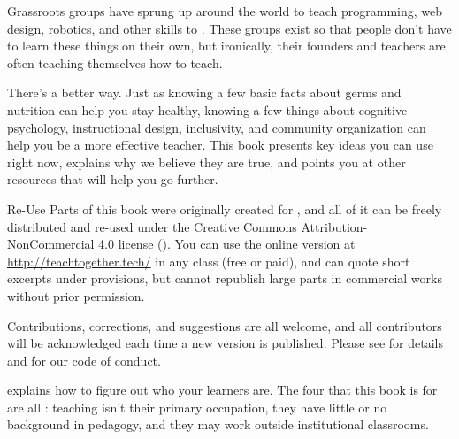 
Grassroots groups have sprung up around the world
to teach programming, web design, robotics, and other skills
to .
These groups exist so that people don't have to learn these things on their own,
but ironically,
their founders and teachers are often teaching themselves how to teach.

There's a better way.
Just as knowing a few basic facts about germs and nutrition can help you stay healthy,
knowing a few things about cognitive psychology,
instructional design,
inclusivity,
and community organization
can help you be a more effective teacher.
This book presents key ideas you can use right now,
explains why we believe they are true,
and points you at other resources that will help you go further.

\begin{aside}{Re-Use}
  Parts of this book were originally created for
  ,
  and all of it can be freely distributed and re-used
  under the Creative Commons Attribution-NonCommercial 4.0 license
  ().
  You can use the online version at \url{http://teachtogether.tech/} in any class
  (free or paid),
  and can quote short excerpts under  provisions,
  but cannot republish large parts in commercial works without prior permission.

  Contributions, corrections, and suggestions are all welcome,
  and all contributors will be acknowledged each time a new version is published.
  Please see  for details
  and  for our code of conduct.
\end{aside}


 explains how to figure out who your learners are.
The four that this book is for are all :
teaching isn't their primary occupation,
they have little or no background in pedagogy,
and they may work outside institutional classrooms.

